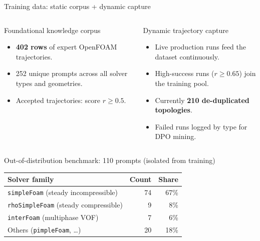 \documentclass[aspectratio=169,10pt]{beamer}
\begin{document}
\begin{frame}{Training data: static corpus + dynamic capture}
\begin{columns}[T,onlytextwidth]
\begin{block}{Foundational knowledge corpus}
\begin{itemize}\footnotesize
  \item \textbf{402 rows} of expert OpenFOAM trajectories.
  \item 252 unique prompts across all solver types and geometries.
  \item Accepted trajectories: score $r\ge0.5$.
\end{itemize}
\end{block}
\begin{block}{Dynamic trajectory capture}
\begin{itemize}\footnotesize
  \item Live production runs feed the dataset continuously.
  \item High-success runs ($r\ge0.65$) join the training pool.
  \item Currently \textbf{210 de-duplicated topologies}.
  \item Failed runs logged by type for DPO mining.
\end{itemize}
\end{block}
\end{columns}
\vspace{0.05cm}
\begin{exampleblock}{Out-of-distribution benchmark: 110 prompts (isolated from training)}
\centering\footnotesize
\begin{tabular}{lrr}
\toprule
\textbf{Solver family} & \textbf{Count} & \textbf{Share} \\
\midrule
\texttt{simpleFoam} (steady incompressible) & 74 & 67\% \\
\texttt{rhoSimpleFoam} (steady compressible) & 9 & 8\% \\
\texttt{interFoam} (multiphase VOF) & 7 & 6\% \\
Others (\texttt{pimpleFoam}, \dots) & 20 & 18\% \\
\bottomrule
\end{tabular}
\end{exampleblock}
\end{frame}
\end{document}
